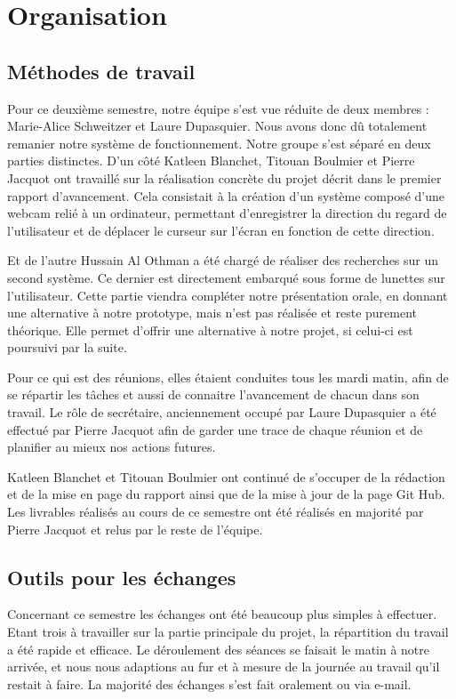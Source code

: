 \chapter{Organisation}

\section{Méthodes de travail}

Pour ce deuxième semestre, notre équipe s’est vue réduite de deux membres : Marie-Alice Schweitzer et Laure Dupasquier. Nous avons donc dû totalement remanier notre système de fonctionnement.
Notre groupe s'est séparé en deux parties distinctes. D’un côté Katleen Blanchet, Titouan Boulmier et Pierre Jacquot ont travaillé sur la réalisation concrète du projet décrit dans le premier rapport d’avancement. Cela consistait à la création d’un système composé d’une webcam relié à un ordinateur, permettant d’enregistrer la direction du regard de l’utilisateur et de déplacer le curseur sur l’écran en fonction de cette direction.

Et de l’autre Hussain Al Othman a été chargé de réaliser des recherches sur un second système. Ce dernier est directement embarqué sous forme de lunettes sur l’utilisateur. Cette partie viendra compléter notre présentation orale, en donnant une alternative à notre prototype, mais n'est pas réalisée et reste purement théorique. Elle permet d’offrir une alternative à notre projet, si celui-ci est poursuivi par la suite.

Pour ce qui est des réunions, elles étaient conduites tous les mardi matin, afin de se répartir les tâches et aussi de connaitre l’avancement de chacun dans son travail. Le rôle de secrétaire, anciennement occupé par Laure Dupasquier a été effectué par Pierre Jacquot afin de garder une trace de chaque réunion et de planifier au mieux nos actions futures.

Katleen Blanchet et Titouan Boulmier ont continué de s’occuper de la rédaction et de la mise en page du rapport ainsi que de la mise à jour de la page Git Hub.
Les livrables réalisés au cours de ce semestre ont été réalisés en majorité par Pierre Jacquot et relus par le reste de l’équipe.

\section{Outils pour les échanges}

Concernant ce semestre les échanges ont été beaucoup plus simples à effectuer. Etant trois à travailler sur la partie principale du projet, la répartition du travail a été rapide et efficace. Le déroulement des séances se faisait le matin à notre arrivée, et nous nous adaptions au fur et à mesure de la journée au travail qu’il restait à faire.
La majorité des échanges s'est fait oralement ou via e-mail.
 
